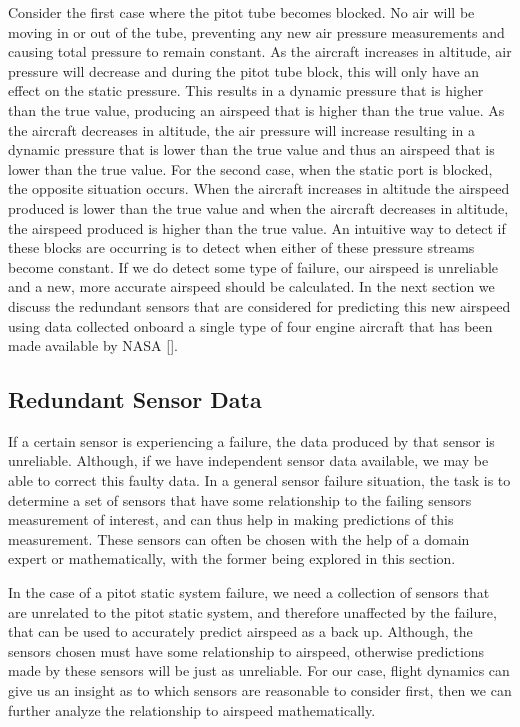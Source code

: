 \documentclass[]{aiaa-tc}
\begin{document}
Consider the first case where the pitot tube becomes blocked. No air will be moving in or out of the tube, preventing any new air pressure measurements and causing total pressure to remain constant. As the aircraft increases in altitude, air pressure will decrease and during the pitot tube block, this will only have an effect on the static pressure. This results in a dynamic pressure that is higher than the true value, producing an airspeed that is higher than the true value. As the aircraft decreases in altitude, the air pressure will increase resulting in a dynamic pressure that is lower than the true value and thus an airspeed that is lower than the true value. For the second case, when the static port is blocked, the opposite situation occurs. When the aircraft increases in altitude the airspeed produced is lower than the true value and when the aircraft decreases in altitude, the airspeed produced is higher than the true value. An intuitive way to detect if these blocks are occurring is to detect when either of these pressure streams become constant. If we do detect some type of failure, our airspeed is unreliable and a new, more accurate airspeed should be calculated. In the next section we discuss the redundant sensors that are considered for predicting this new airspeed using data collected onboard a single type of four engine aircraft that has been made available by NASA [].

\subsection{Redundant Sensor Data}
\label{sec:redundantSensorData}

If a certain sensor is experiencing a failure, the data produced by that sensor is unreliable. Although, if we have independent sensor data available, we may be able to correct this faulty data. In a general sensor failure situation, the task is to determine a set of sensors that have some relationship to the failing sensors measurement of interest, and can thus help in making predictions of this measurement. These sensors can often be chosen with the help of a domain expert or mathematically, with the former being explored in this section. 

In the case of a pitot static system failure, we need a collection of sensors that are unrelated to the pitot static system, and therefore unaffected by the failure, that can be used to accurately predict airspeed as a back up. Although, the sensors chosen must have some relationship to airspeed, otherwise predictions made by these sensors will be just as unreliable. For our case, flight dynamics can give us an insight as to which sensors are reasonable to consider first, then we can further analyze the relationship to airspeed mathematically. 
\end{document}
